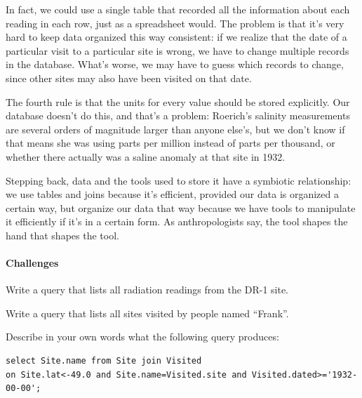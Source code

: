 \documentclass{book}
\begin{document}
In fact, we could use a single table that recorded all the information
about each reading in each row, just as a spreadsheet would. The problem
is that it's very hard to keep data organized this way consistent: if we
realize that the date of a particular visit to a particular site is
wrong, we have to change multiple records in the database. What's worse,
we may have to guess which records to change, since other sites may also
have been visited on that date.

The fourth rule is that the units for every value should be stored
explicitly. Our database doesn't do this, and that's a problem:
Roerich's salinity measurements are several orders of magnitude larger
than anyone else's, but we don't know if that means she was using parts
per million instead of parts per thousand, or whether there actually was
a saline anomaly at that site in 1932.

Stepping back, data and the tools used to store it have a symbiotic
relationship: we use tables and joins because it's efficient, provided
our data is organized a certain way, but organize our data that way
because we have tools to manipulate it efficiently if it's in a certain
form. As anthropologists say, the tool shapes the hand that shapes the
tool.

\mbox{}\paragraph{Challenges}

\begin{swcenumerate}
\item
  Write a query that lists all radiation readings from the DR-1 site.
\item
  Write a query that lists all sites visited by people named ``Frank''.
\item
  Describe in your own words what the following query produces:

\begin{verbatim}
select Site.name from Site join Visited
on Site.lat<-49.0 and Site.name=Visited.site and Visited.dated>='1932-00-00';
\end{verbatim}
\end{swcenumerate}
\end{document}
